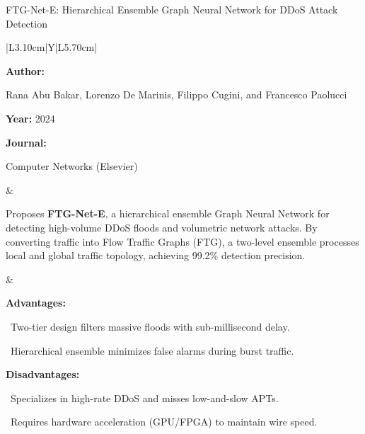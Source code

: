 \begin{frame}[t]{FTG-Net-E: Hierarchical Ensemble Graph Neural Network for DDoS Attack Detection}
\vspace{-0.30em}
{\footnotesize\setlength{\tabcolsep}{3.5pt}\renewcommand{\arraystretch}{1.10}
\begin{tabularx}{\textwidth}{|L{3.10cm}|Y|L{5.70cm}|}
\hline\lrhdr\hline
\begin{minipage}[t]{\linewidth}\fontsize{7.2pt}{9.2pt}\raggedright\selectfont
\textbf{Author:}\par
Rana Abu Bakar, Lorenzo De Marinis, Filippo Cugini, and Francesco Paolucci\par\vspace{4pt}
\textbf{Year:} 2024\par\vspace{4pt}
\textbf{Journal:}\par
Computer Networks (Elsevier)\par\vspace{4pt}
\end{minipage}
&
\begin{minipage}[t]{\linewidth}\fontsize{7.2pt}{9.2pt}\raggedright\selectfont
Proposes \textbf{FTG-Net-E}, a hierarchical ensemble Graph Neural Network for detecting high-volume DDoS floods and volumetric network attacks. By converting traffic into Flow Traffic Graphs (FTG), a two-level ensemble processes local and global traffic topology, achieving 99.2\% detection precision.\par\vspace{4pt}
\end{minipage}
&
\begin{minipage}[t]{\linewidth}\fontsize{7.2pt}{9.0pt}\raggedright\selectfont
\textcolor{strengthGreen}{\textbf{Advantages:}}\par\vspace{1.5pt}
\textbullet~Two-tier design filters massive floods with sub-millisecond delay.\par\vspace{2.0pt}\textbullet~Hierarchical ensemble minimizes false alarms during burst traffic.\par\vspace{4.0pt}
\textcolor{limitRed}{\textbf{Disadvantages:}}\par\vspace{1.5pt}
\textbullet~Specializes in high-rate DDoS and misses low-and-slow APTs.\par\vspace{2.0pt}\textbullet~Requires hardware acceleration (GPU/FPGA) to maintain wire speed.\par\vspace{4pt}
\end{minipage} \\\hline
\end{tabularx}}
\end{frame}

